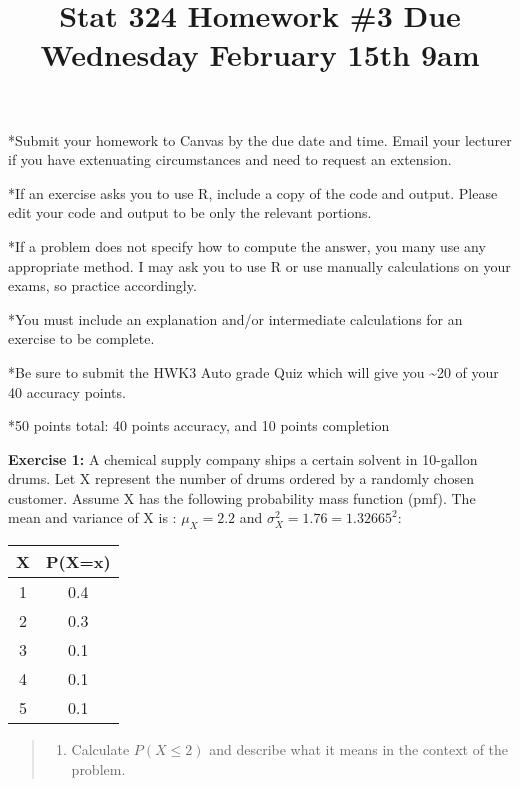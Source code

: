 \documentclass[
]{article}
\title{Stat 324 Homework \#3 Due Wednesday February 15th 9am}
\author{}
\date{\vspace{-2.5em}}
\providecommand{\tightlist}{%
  \setlength{\itemsep}{0pt}\setlength{\parskip}{0pt}}
\begin{document}
\maketitle

*Submit your homework to Canvas by the due date and time. Email your
lecturer if you have extenuating circumstances and need to request an
extension.

*If an exercise asks you to use R, include a copy of the code and
output. Please edit your code and output to be only the relevant
portions.

*If a problem does not specify how to compute the answer, you many use
any appropriate method. I may ask you to use R or use manually
calculations on your exams, so practice accordingly.

*You must include an explanation and/or intermediate calculations for an
exercise to be complete.

*Be sure to submit the HWK3 Auto grade Quiz which will give you
\textasciitilde20 of your 40 accuracy points.

*50 points total: 40 points accuracy, and 10 points completion

\vspace{.5cm}

\textbf{Exercise 1:} A chemical supply company ships a certain solvent
in 10-gallon drums. Let X represent the number of drums ordered by a
randomly chosen customer. Assume X has the following probability mass
function (pmf). The mean and variance of X is : \(\mu_X=2.2\) and
\(\sigma^2_X=1.76=1.32665^2\):

\begin{longtable}[]{@{}cc@{}}
\toprule()
X & P(X=x) \\
\midrule()
\endhead
1 & 0.4 \\
2 & 0.3 \\
3 & 0.1 \\
4 & 0.1 \\
5 & 0.1 \\
\bottomrule()
\end{longtable}

\begin{quote}
\begin{enumerate}
\def\labelenumi{\alph{enumi}.}
\tightlist
\item
  Calculate \(P(X \le 2)\) and describe what it means in the context of
  the problem.
\end{enumerate}
\end{quote}
\end{document}
